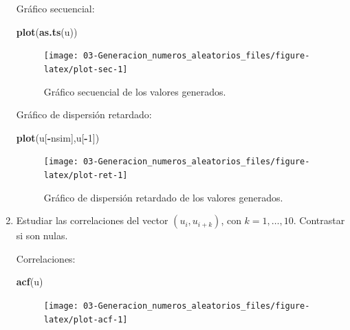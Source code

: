 \documentclass[
]{book}
\newenvironment{Shaded}{\begin{snugshade}}{\end{snugshade}}
\newcommand{\DecValTok}[1]{\textcolor[rgb]{0.00,0.00,0.81}{#1}}
\newcommand{\KeywordTok}[1]{\textcolor[rgb]{0.13,0.29,0.53}{\textbf{#1}}}
\newcommand{\NormalTok}[1]{#1}
\newcommand{\OperatorTok}[1]{\textcolor[rgb]{0.81,0.36,0.00}{\textbf{#1}}}
\theoremstyle{break}
\theoremstyle{definition}
\theoremstyle{definition}
\theoremstyle{definition}
\theoremstyle{remark}
\begin{document}
\begin{enumerate}
  Gráfico secuencial:

\begin{Shaded}
\begin{Highlighting}[]
\KeywordTok{plot}\NormalTok{(}\KeywordTok{as.ts}\NormalTok{(u))}
\end{Highlighting}
\end{Shaded}

  \begin{figure}[!htb]

  {\centering \texttt{[image: 03-Generacion\_numeros\_aleatorios\_files/figure-latex/plot-sec-1]} 

  }

  \caption{Gráfico secuencial de los valores generados.}\label{fig:plot-sec}
  \end{figure}

  Gráfico de dispersión retardado:

\begin{Shaded}
\begin{Highlighting}[]
\KeywordTok{plot}\NormalTok{(u[}\OperatorTok{-}\NormalTok{nsim],u[}\OperatorTok{-}\DecValTok{1}\NormalTok{])}
\end{Highlighting}
\end{Shaded}

  \begin{figure}[!htb]

  {\centering \texttt{[image: 03-Generacion\_numeros\_aleatorios\_files/figure-latex/plot-ret-1]} 

  }

  \caption{Gráfico de dispersión retardado de los valores generados.}\label{fig:plot-ret}
  \end{figure}
\item
  Estudiar las correlaciones del vector \((u_{i},u_{i+k})\), con
  \(k=1,\ldots,10\). Contrastar si son nulas.

  Correlaciones:

\begin{Shaded}
\begin{Highlighting}[]
\KeywordTok{acf}\NormalTok{(u)}
\end{Highlighting}
\end{Shaded}

  \begin{figure}[!htb]

  {\centering \texttt{[image: 03-Generacion\_numeros\_aleatorios\_files/figure-latex/plot-acf-1]} 

  }


\end{figure}
\end{enumerate}
\end{document}
